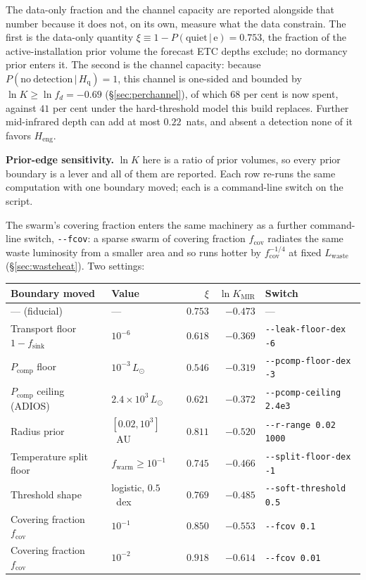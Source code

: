 \documentclass[11pt]{article}
\newcommand{\lnK}{\ensuremath{\ln K}}
\newcommand{\Heng}{\ensuremath{H_{\mathrm{eng}}}}
\newcommand{\Hgas}{\ensuremath{H_{\mathrm{q}}}}
\begin{document}
The data-only fraction and the channel capacity are reported alongside that number because it does not, on its own, measure what the data constrain. The first is the data-only quantity $\xi \equiv 1 - P(\mathrm{quiet}\,|\,\mathrm{e}) = 0.753$, the fraction of the active-installation prior volume the forecast ETC depths exclude; no dormancy prior enters it. The second is the channel capacity: because $P(\mathrm{no\ detection}\,|\,\Hgas) = 1$, this channel is one-sided and bounded by $\lnK \geq \ln f_{d} = -0.69$ (\S\ref{sec:perchannel}), of which $68$ per cent is now spent, against $41$ per cent under the hard-threshold model this build replaces. Further mid-infrared depth can add at most $0.22$~nats, and absent a detection none of it favors \Heng.

\textbf{Prior-edge sensitivity.} $\lnK$ here is a ratio of prior volumes, so every prior boundary is a lever and all of them are reported. Each row re-runs the same computation with one boundary moved; each is a command-line switch on the script.

The swarm's covering fraction enters the same machinery as a further
command-line switch, \texttt{-{}-fcov}: a sparse swarm of covering fraction
$f_{\mathrm{cov}}$ radiates the same waste luminosity from a smaller area
and so runs hotter by $f_{\mathrm{cov}}^{-1/4}$ at fixed $L_{\mathrm{waste}}$
(\S\ref{sec:wasteheat}). Two settings:

\begin{center}
\small
\begin{tabular}{llrrl}
\toprule
Boundary moved & Value & $\xi$ & $\lnK_{\mathrm{MIR}}$ & Switch \\
\midrule
--- (fiducial) & --- & $0.753$ & $-0.473$ & --- \\
Transport floor $1-f_{\mathrm{sink}}$ & $10^{-6}$ & $0.618$ & $-0.369$ & \texttt{-{}-leak-floor-dex -6} \\
$P_{\mathrm{comp}}$ floor & $10^{-3}\,L_{\odot}$ & $0.546$ & $-0.319$ & \texttt{-{}-pcomp-floor-dex -3} \\
$P_{\mathrm{comp}}$ ceiling (ADIOS) & $2.4\times10^{3}\,L_{\odot}$ & $0.621$ & $-0.372$ & \texttt{-{}-pcomp-ceiling 2.4e3} \\
Radius prior & $[0.02, 10^{3}]$~AU & $0.811$ & $-0.520$ & \texttt{-{}-r-range 0.02 1000} \\
Temperature split floor & $f_{\mathrm{warm}} \geq 10^{-1}$ & $0.745$ & $-0.466$ & \texttt{-{}-split-floor-dex -1} \\
Threshold shape & logistic, $0.5$~dex & $0.769$ & $-0.485$ & \texttt{-{}-soft-threshold 0.5} \\
Covering fraction $f_{\mathrm{cov}}$ & $10^{-1}$ & $0.850$ & $-0.553$ & \texttt{-{}-fcov 0.1} \\
Covering fraction $f_{\mathrm{cov}}$ & $10^{-2}$ & $0.918$ & $-0.614$ & \texttt{-{}-fcov 0.01} \\
\bottomrule
\end{tabular}
\end{center}
\end{document}

